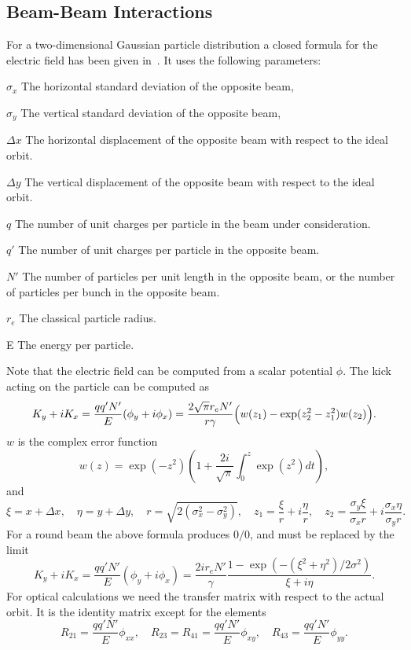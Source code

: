 \subsection{Beam-Beam Interactions}
For a two-dimensional Gaussian particle distribution a closed formula
for the electric field has been given in~\cite{BAS80}.
It uses the following parameters:
\begin{mylist}
\item[$\sigma_x$]
The horizontal standard deviation of the opposite beam,
\item[$\sigma_y$]
The vertical standard deviation of the opposite beam,
\item[$\Delta x$]
The horizontal displacement of the opposite beam with respect to the
ideal orbit.
\item[$\Delta y$]
The vertical displacement of the opposite beam with respect to the
ideal orbit.
\item[$q$]
The number of unit charges per particle in the beam under consideration.
\item[$q'$]
The number of unit charges per particle in the opposite beam.
\item[$N'$]
The number of particles per unit length in the opposite beam,
or the number of particles per bunch in the opposite beam.
\item[$r_e$]
The classical particle radius.
\item[E]
The energy per particle.
\end{mylist}
Note that the electric field can be computed from a scalar potential $\phi$.
The kick acting on the particle can be computed as
\[
K_y + i K_x =
\frac{qq'N'}{E} (\phi_y + i \phi_x) =
\frac{2\sqrt{\pi}r_eN'}{r\gamma} \Bigl(w(z_1) - \exp(z_2^2-z_1^2) w(z_2)\Bigr).
\]
$w$ is the complex error function
\[
w(z)=\exp(-z^2)\left(1+\frac{2i}{\sqrt{\pi}}\int_0^z\exp(z^2)dt\right),
\]
and
\[
\xi  = x + \Delta x, \quad
\eta = y + \Delta y, \quad
r    = \sqrt{2 (\sigma_x^2 - \sigma_y^2)}, \quad
z_1  = \frac{\xi}{r} + i \frac{\eta}{r}, \quad
z_2  = \frac{\sigma_y \xi}{\sigma_x r} + i \frac{\sigma_x \eta}{\sigma_y r}.
\]
For a round beam the above formula produces $0/0$,
and must be replaced by the limit
\[
K_y + i K_x =
\frac{qq'N'}{E} (\phi_y + i \phi_x) =
\frac{2 i r_e N'}{\gamma}
\frac{1 - \exp(- (\xi^2 + \eta^2) / 2 \sigma^2)}{\xi + i\eta}.
\]                                                          
For optical calculations we need the transfer matrix with respect 
to the actual orbit.
It is the identity matrix except for the elements
\[
R_{21} = \frac{qq'N'}{E} \phi_{xx}, \quad
R_{23} = R_{41} = \frac{qq'N'}{E} \phi_{xy}, \quad
R_{43} = \frac{qq'N'}{E} \phi_{yy}.
\]
